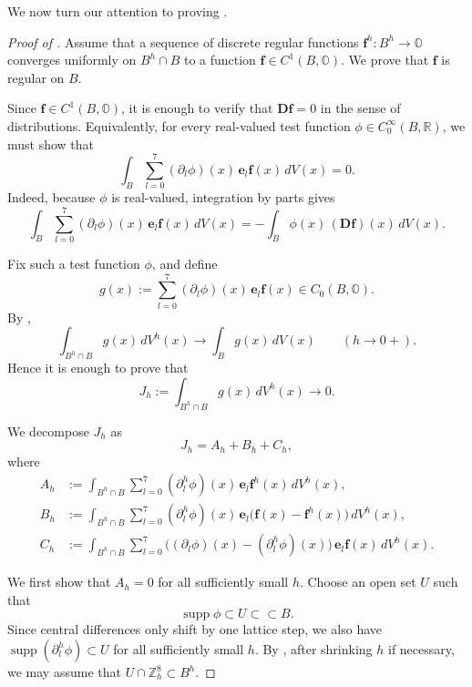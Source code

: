 \documentclass{amsart}
\theoremstyle{definition}
\theoremstyle{remark}
\numberwithin{equation}{section}
\newcommand{\R}{\mathbb{R}}
\newcommand{\p}{\partial}
\newcommand{\OO}{\mathbb O}
\newcommand{\Z}{\mathbb Z}
\newcommand{\f}{\bm{f}}
\newcommand{\e}{\bm{e}}
\begin{document}
We now turn our attention to proving .

\begin{proof}[Proof of ]
    Assume that a sequence of discrete regular functions $\f^h : B^h \longrightarrow \OO$ converges uniformly on $B^h\cap B$ to a function $\f\in C^1(B,\OO)$. We prove that $\f$ is regular on $B$.

    Since $\f\in C^1(B,\OO)$, it is enough to verify that $\bm D\f=0$ in the sense of distributions. Equivalently, for every real-valued test function $\phi\in C_0^\infty(B,\R)$, we must show that
    \begin{equation}
        \label{2026-04-01 00:00:06}
        \int_B \sum_{l=0}^7 (\p_l\phi)(x)\,\e_l\f(x)\,dV(x)=0.
    \end{equation}
    Indeed, because $\phi$ is real-valued, integration by parts gives
    \[
    \int_B \sum_{l=0}^7 (\p_l\phi)(x)\,\e_l\f(x)\,dV(x)
    =-\int_B \phi(x)\,(\bm D\f)(x)\,dV(x).
    \]

    Fix such a test function $\phi$, and define
    \[
    g(x):=\sum_{l=0}^7 (\p_l\phi)(x)\,\e_l\f(x)\in C_0(B,\OO).
    \]
    By ,
    \[
    \int_{B^h\cap B} g(x)\,dV^h(x) \longrightarrow \int_B g(x)\,dV(x)
    \qquad (h\to 0+).
    \]
    Hence it is enough to prove that
    \[
    J_h:=\int_{B^h\cap B} g(x)\,dV^h(x) \longrightarrow 0.
    \]

    We decompose $J_h$ as
    \[
    J_h=A_h+B_h+C_h,
    \]
    where
    \[
    \begin{aligned}
        A_h&:=\int_{B^h\cap B}\sum_{l=0}^7 (\p_l^h\phi)(x)\,\e_l\f^h(x)\,dV^h(x),\\
        B_h&:=\int_{B^h\cap B}\sum_{l=0}^7 (\p_l^h\phi)(x)\,\e_l\bigl(\f(x)-\f^h(x)\bigr)\,dV^h(x),\\
        C_h&:=\int_{B^h\cap B}\sum_{l=0}^7 \bigl((\p_l\phi)(x)-(\p_l^h\phi)(x)\bigr)\,\e_l\f(x)\,dV^h(x).
    \end{aligned}
    \]

    We first show that $A_h=0$ for all sufficiently small $h$. Choose an open set $U$ such that
    \[
    \operatorname{supp}\phi \subset U \subset\subset B.
    \]
    Since central differences only shift by one lattice step, we also have $\operatorname{supp}(\p_l^h\phi)\subset U$ for all sufficiently small $h$. By , after shrinking $h$ if necessary, we may assume that $U\cap \Z_h^8\subset B^h$.


\end{proof}
\end{document}
